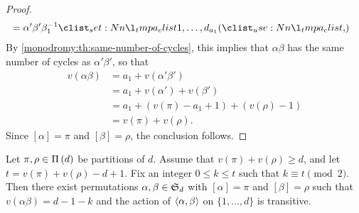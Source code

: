\begin{proof}
\begin{align*}
&=\alpha'\beta'\beta_1^{-1}\cycle{1,\ldots,d_{a_1}}
\end{align*}
By \cref{monodromy:th:same-number-of-cycles}, this implies that $\alpha\beta$ has the same number of cycles as $\alpha'\beta'$, so that
\begin{align*}
v(\alpha\beta)&=a_1+v(\alpha'\beta')\\
&=a_1+v(\alpha')+v(\beta')\\
&=a_1+(v(\pi)-a_1+1)+(v(\rho)-1)\\
&=v(\pi)+v(\rho).
\end{align*}
Since $[\alpha]=\pi$ and $[\beta]=\rho$, the conclusion follows.
\end{proof}

\begin{proposition}\label{monodromy:th:product-reduction-large-v-odd}
Let $\pi,\rho\in\Pi\left(d\right)$ be partitions of $d$. Assume that $v(\pi)+v(\rho)\ge d$, and let $t=v(\pi)+v(\rho)-d+1$. Fix an integer $0\le k\le t$ such that $k\equiv t\pmod{2}$. Then there exist permutations $\alpha,\beta\in\symgroup[d]$ with $[\alpha]=\pi$ and $[\beta]=\rho$ such that $v(\alpha\beta)=d-1-k$ and the action of $\left\langle\alpha,\beta\right\rangle$ on $\{1,\ldots,d\}$ is transitive.
\end{proposition}
